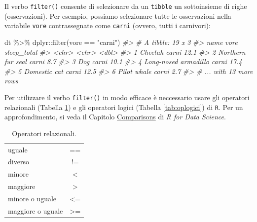 \documentclass[
  10pt,
  italian,
  a4paper,
  extrafontsizes,onecolumn,openright
  ]{memoir}
\newenvironment{Shaded}{\begin{snugshade}}{\end{snugshade}}
\newcommand{\CommentTok}[1]{\textcolor[rgb]{0.56,0.35,0.01}{\textit{#1}}}
\newcommand{\FunctionTok}[1]{\textcolor[rgb]{0.00,0.00,0.00}{#1}}
\newcommand{\NormalTok}[1]{#1}
\newcommand{\SpecialCharTok}[1]{\textcolor[rgb]{0.00,0.00,0.00}{#1}}
\newcommand{\StringTok}[1]{\textcolor[rgb]{0.31,0.60,0.02}{#1}}
\begin{document}
Il verbo \texttt{filter()} consente di selezionare da un \texttt{tibble} un sottoinsieme di righe (osservazioni). Per esempio, possiamo selezionare tutte le osservazioni nella variabile \texttt{vore} contrassegnate come \texttt{carni} (ovvero, tutti i carnivori):

\begin{Shaded}
\begin{Highlighting}[]
\NormalTok{dt }\SpecialCharTok{\%\textgreater{}\%}
\NormalTok{  dplyr}\SpecialCharTok{::}\FunctionTok{filter}\NormalTok{(vore }\SpecialCharTok{==} \StringTok{"carni"}\NormalTok{)}
\CommentTok{\#\textgreater{} \# A tibble: 19 x 3}
\CommentTok{\#\textgreater{}   name                 vore  sleep\_total}
\CommentTok{\#\textgreater{}   \textless{}chr\textgreater{}                \textless{}chr\textgreater{}       \textless{}dbl\textgreater{}}
\CommentTok{\#\textgreater{} 1 Cheetah              carni        12.1}
\CommentTok{\#\textgreater{} 2 Northern fur seal    carni         8.7}
\CommentTok{\#\textgreater{} 3 Dog                  carni        10.1}
\CommentTok{\#\textgreater{} 4 Long{-}nosed armadillo carni        17.4}
\CommentTok{\#\textgreater{} 5 Domestic cat         carni        12.5}
\CommentTok{\#\textgreater{} 6 Pilot whale          carni         2.7}
\CommentTok{\#\textgreater{} \# ... with 13 more rows}
\end{Highlighting}
\end{Shaded}

Per utilizzare il verbo \texttt{filter()} in modo efficace è neccessario usare gli operatori relazionali (Tabella \ref{tab:oprelazionali}) e gli operatori logici (Tabella \ref{tab:oplogici}) di \texttt{R}. Per un approfondimento, si veda il Capitolo \href{https://r4ds.had.co.nz/transform.html}{Comparisons} di \emph{R for Data Science}.

\begin{table}[h!]
  \begin{center}
    \caption{Operatori relazionali.}
    \label{tab:oprelazionali}
    \begin{tabular}{l c} 
      \toprule
      uguale             &  == \\
      diverso            &  !=  \\
      minore             &  <  \\
      maggiore           &  >  \\
      minore o uguale      & <=  \\
      maggiore o uguale  & >=  \\
      \bottomrule
    \end{tabular}
  \end{center}
\end{table}
\end{document}
